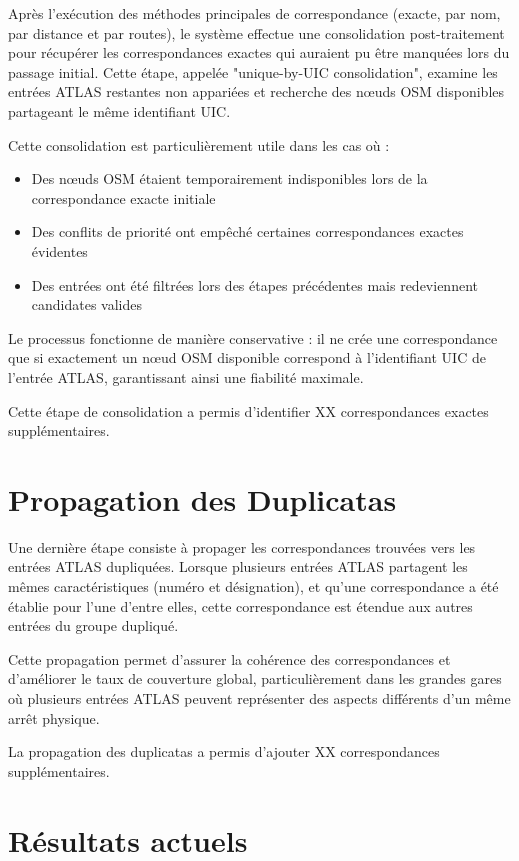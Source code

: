 Après l'exécution des méthodes principales de correspondance (exacte, par nom, par distance et par routes), le système effectue une consolidation post-traitement pour récupérer les correspondances exactes qui auraient pu être manquées lors du passage initial. Cette étape, appelée "unique-by-UIC consolidation", examine les entrées ATLAS restantes non appariées et recherche des nœuds OSM disponibles partageant le même identifiant UIC.

Cette consolidation est particulièrement utile dans les cas où :
\begin{itemize}
    \item Des nœuds OSM étaient temporairement indisponibles lors de la correspondance exacte initiale
    \item Des conflits de priorité ont empêché certaines correspondances exactes évidentes
    \item Des entrées ont été filtrées lors des étapes précédentes mais redeviennent candidates valides
\end{itemize}

Le processus fonctionne de manière conservative : il ne crée une correspondance que si exactement un nœud OSM disponible correspond à l'identifiant UIC de l'entrée ATLAS, garantissant ainsi une fiabilité maximale.

Cette étape de consolidation a permis d'identifier XX correspondances exactes supplémentaires.

\section{Propagation des Duplicatas}

Une dernière étape consiste à propager les correspondances trouvées vers les entrées ATLAS dupliquées. Lorsque plusieurs entrées ATLAS partagent les mêmes caractéristiques (numéro et désignation), et qu'une correspondance a été établie pour l'une d'entre elles, cette correspondance est étendue aux autres entrées du groupe dupliqué.

Cette propagation permet d'assurer la cohérence des correspondances et d'améliorer le taux de couverture global, particulièrement dans les grandes gares où plusieurs entrées ATLAS peuvent représenter des aspects différents d'un même arrêt physique.

La propagation des duplicatas a permis d'ajouter XX correspondances supplémentaires.

\section{Résultats actuels}

